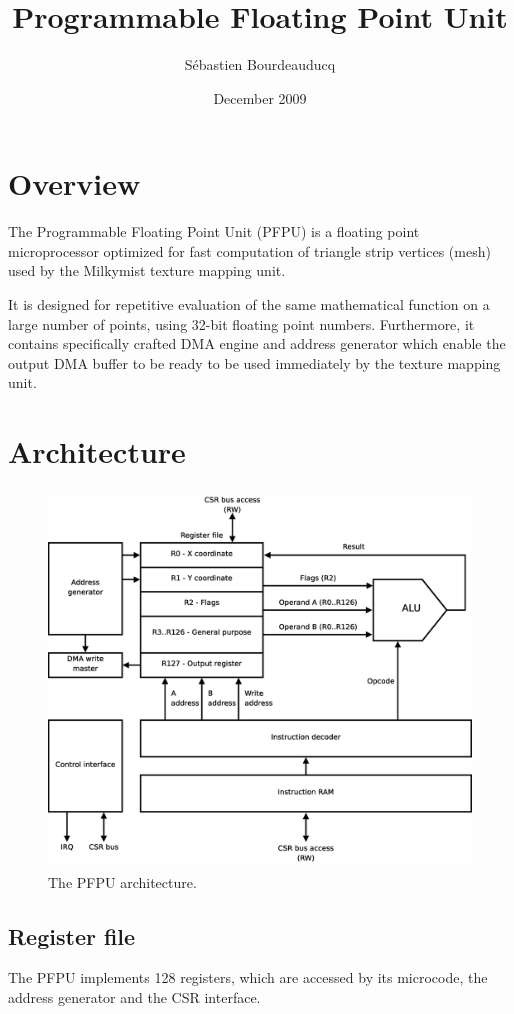 \documentclass[a4paper,11pt]{article}
\title{Programmable Floating Point Unit}
\author{S\'ebastien Bourdeauducq}
\date{December 2009}
\begin{document}
\setlength{\parindent}{0pt}
\setlength{\parskip}{5pt}
\maketitle{}
\section{Overview}
The Programmable Floating Point Unit (PFPU) is a floating point microprocessor optimized for fast computation of triangle strip vertices (mesh) used by the Milkymist texture mapping unit.

It is designed for repetitive evaluation of the same mathematical function on a large number of points, using 32-bit floating point numbers. Furthermore, it contains specifically crafted DMA engine and address generator which enable the output DMA buffer to be ready to be used immediately by the texture mapping unit.

\section{Architecture}

\begin{figure}[H]
\centering
\includegraphics[height=100mm]{architecture.eps}
\caption{The PFPU architecture.}\label{fig:architecture}
\end{figure}

\subsection{Register file}
The PFPU implements 128 registers, which are accessed by its microcode, the address generator and the CSR interface.\\
\end{document}
